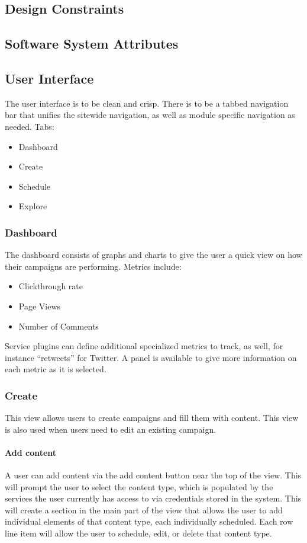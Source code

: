 \documentclass{report}
\begin{document}
	\subsection{Design Constraints} %
	\subsection{Software System Attributes} %
	\subsection{User Interface} %
		The user interface is to be clean and crisp. There is to be a tabbed 
		navigation bar that unifies the sitewide navigation, as well as module 
		specific navigation as needed.
        Tabs:
        \begin{itemize}
        \item Dashboard
        \item Create
        \item Schedule
        \item Explore
        \end{itemize}
        \subsubsection{Dashboard}
        The dashboard consists of graphs and charts to give the user a quick view on how their campaigns are performing.
		Metrics include:
        \begin{itemize}
        \item Clickthrough rate
        \item Page Views
        \item Number of Comments
        \end{itemize}
        Service plugins can define additional specialized metrics to track, as well, for instance ``retweets'' for Twitter.
        A panel is available to give more information on each metric as it is selected.
        \subsubsection{Create}
        This view allows users to create campaigns and fill them with content.  This view is also used when users need to edit an existing campaign.
        \paragraph{Add content}
        A user can add content via the add content button near the top of the view.  This will prompt the user to select the content type, which is populated by the services the user currently has access to via credentials stored in the system. This will create a section in the main part of the view that allows the user to add individual elements of that content type, each individually scheduled.  Each row line item will allow the user to schedule, edit, or delete that content type.
\end{document}
